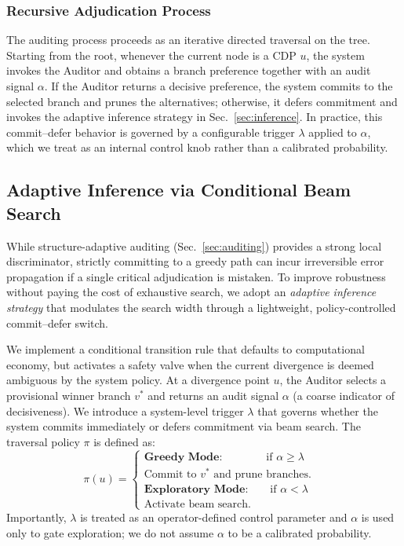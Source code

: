 \documentclass{article}
\theoremstyle{plain}
\theoremstyle{definition}
\theoremstyle{remark}
\begin{document}
\subsubsection{Recursive Adjudication Process}
The auditing process proceeds as an iterative directed traversal on the tree. Starting from the root, whenever the current node is a CDP $u$, the system invokes the Auditor and obtains a branch preference together with an audit signal $\alpha$. If the Auditor returns a decisive preference, the system commits to the selected branch and prunes the alternatives; otherwise, it defers commitment and invokes the adaptive inference strategy in Sec.~\ref{sec:inference}. In practice, this commit--defer behavior is governed by a configurable trigger $\lambda$ applied to $\alpha$, which we treat as an internal control knob rather than a calibrated probability.


\subsection{Adaptive Inference via Conditional Beam Search}
\label{app:inference}

While structure-adaptive auditing (Sec.~\ref{sec:auditing}) provides a strong local discriminator, strictly committing to a greedy path can incur irreversible error propagation if a single critical adjudication is mistaken. To improve robustness without paying the cost of exhaustive search, we adopt an \textit{adaptive inference strategy} that modulates the search width through a lightweight, policy-controlled commit--defer switch.

We implement a conditional transition rule that defaults to computational economy, but activates a safety valve when the current divergence is deemed ambiguous by the system policy.
At a divergence point $u$, the Auditor selects a provisional winner branch $v^*$ and returns an audit signal $\alpha$ (a coarse indicator of decisiveness). We introduce a system-level trigger $\lambda$ that governs whether the system commits immediately or defers commitment via beam search. The traversal policy $\pi$ is defined as:
\begin{equation}
    \pi(u) = 
    \begin{cases} 
    \textbf{Greedy Mode:} \quad \quad \quad \quad\text{if } \alpha \geq \lambda \\
    \text{Commit to } v^* \text{ and prune branches.} & \\[4pt]
    \textbf{Exploratory Mode:} \quad \quad \text{if } \alpha < \lambda \\
    \text{Activate beam search.} &
    \end{cases}
\end{equation}
Importantly, $\lambda$ is treated as an operator-defined control parameter and $\alpha$ is used only to gate exploration; we do not assume $\alpha$ to be a calibrated probability.
\end{document}

